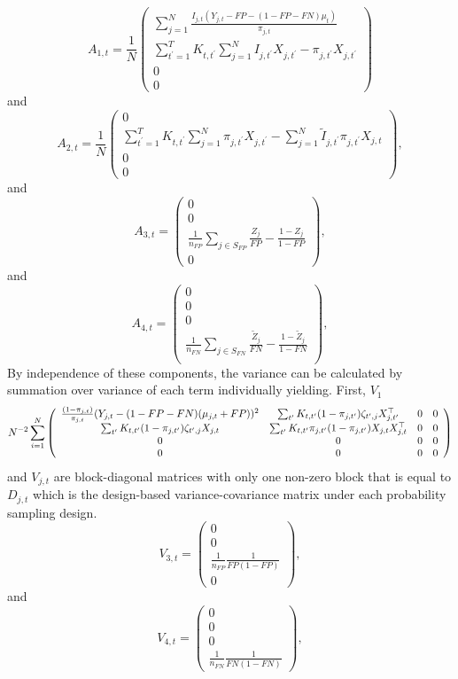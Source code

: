 \documentclass[11pt]{amsart}
\numberwithin{equation}{section}
\theoremstyle{plain}
\begin{document}
$$
A_{1,t} = \frac{1}{N} \left( \begin{array}{c}
\sum_{j=1}^N \frac{I_{j,t} (Y_{j,t} - FP - (1-FP-FN) \mu_t)}{\pi_{j,t}} \\
\sum_{t^\prime = 1}^T K_{t,t^\prime} \sum_{j=1}^N I_{j,t^\prime} X_{j,t^\prime} - \pi_{j,t^\prime} X_{j,t^\prime} \\
0 \\
0
\end{array}
\right)
$$
and
$$
A_{2,t} = \frac{1}{N} \left( \begin{array}{c}
0 \\
\sum_{t^\prime = 1}^T K_{t,t^\prime} \sum_{j=1}^N \pi_{j,t^\prime} X_{j,t^\prime} - \sum_{j=1}^N \tilde I_{j,t^\prime} \pi_{j,t^\prime} X_{j,t} \\
0 \\
0
\end{array}
\right),
$$
and
$$
A_{3,t} = \left( \begin{array}{c}
0 \\
0 \\
\frac{1}{n_{FP}} \sum_{j \in S_{FP}} \frac{Z_j}{FP} - \frac{1-Z_j}{1-FP} \\
0
\end{array}
\right),
$$
and
$$
A_{4,t} = \left( \begin{array}{c}
0 \\
0 \\
0 \\
\frac{1}{n_{FN}} \sum_{j \in S_{FN}} \frac{\tilde Z_j}{FN} - \frac{1-\tilde Z_j}{1-FN} \\
\end{array}
\right),
$$
By independence of these components, the variance can be calculated by summation over variance of each term individually yielding. First, $V_1$
{
\tiny
$$
 N^{-2} \sum_{i=1}^N \left(
\begin{array}{c c c c}
\frac{(1-\pi_{j,t})}{\pi_{j,t}} (Y_{j,t} - (1-FP-FN) (\mu_{j,t} +FP))^2 & \sum_{t^\prime} K_{t,t^\prime} (1-\pi_{j,t^\prime}) \zeta_{t^\prime, j} X_{j,t^\prime}^\top & 0 & 0 \\
\sum_{t^\prime} K_{t,t^\prime} (1-\pi_{j,t^\prime}) \zeta_{t^\prime, j} X_{j,t}&
\sum_{t^\prime} K_{t,t^\prime} \pi_{j,t^\prime} (1-\pi_{j,t^\prime}) X_{j,t} X_{j,t}^\top
& 0 & 0 \\
0 & 0 & 0 & 0 \\
0 & 0 & 0 & 0 \\
\end{array}
\right)
$$
}
and $V_{j,t}$ are block-diagonal matrices with only one non-zero block that is equal to $D_{j,t}$ which is the design-based variance-covariance matrix under each probability sampling design.
$$
V_{3,t} = \left( \begin{array}{c}
0 \\
0 \\
\frac{1}{n_{FP}} \frac{1}{FP(1-FP)} \\
0
\end{array}
\right),
$$
and
$$
V_{4,t} = \left( \begin{array}{c}
0 \\
0 \\
0 \\
\frac{1}{n_{FN}} \frac{1}{FN(1-FN)}
\end{array}
\right),
$$
\end{document}
